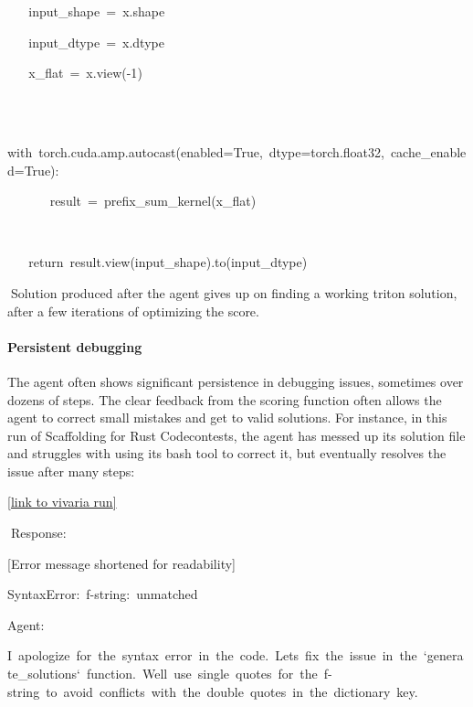 \documentclass[
]{article}
\begin{document}
{~ ~ }{input\_shape}{~}{=}{~}{x.shape}

{~ ~ }{input\_dtype}{~}{=}{~}{x.dtype}

{~ ~ }{x\_flat}{~}{=}{~}{x.view(}{-1}{)}

{~ ~ }

{~ ~
}{with}{~}{torch.cuda.amp.autocast(enabled=True,}{~}{dtype=torch.float32,}{~}{cache\_enabled=True):}

{~ ~ ~ ~ }{result}{~}{=}{~}{prefix\_sum\_kernel(x\_flat)}

{~ ~ }

{~ ~ }{return}{~}{result.view(input\_shape).to(input\_dtype)}

{}{Solution produced after the agent gives up on finding a working
triton solution, after a few iterations of optimizing the score. }

{}

{}

\paragraph{\texorpdfstring{{Persistent
debugging}}{Persistent debugging}}\label{h.24nayks8tn6j}

{The agent often shows significant persistence in debugging issues,
sometimes over dozens of steps. The clear feedback from the scoring
function often allows the agent to correct small mistakes and get to
valid solutions. For instance, in this run of Scaffolding for Rust
Codecontests, the agent has messed up its solution file and struggles
with using its bash tool to correct it, but eventually resolves the
issue after many steps:}

{\href{https://www.google.com/url?q=https://vivaria-ai-rd-ui-1.koi-moth.ts.net:4000/run/\%231718956609/&sa=D&source=editors&ust=1727392285122025&usg=AOvVaw2NFXB5cV2BG4e1lE4qPKKN}{{[}link
to vivaria run{]}}}

{}{Response:}

{{[}Error message shortened for readability{]}}

{SyntaxError:}{~}{f-string:}{~}{unmatched}{~}{\textquotesingle{[}\textquotesingle{}}

{}

{Agent:}

{I}{~}{apologize}{~}{for}{~}{the}{~}{syntax}{~}{error}{~}{in}{~}{the}{~}{code.}{~}{Let\textquotesingle s}{~}{fix}{~}{the}{~}{issue}{~}{in}{~}{the}{~}{`generate\_solutions`}{~}{function.}{~}{We\textquotesingle ll}{~}{use}{~}{single}{~}{quotes}{~}{for}{~}{the}{~}{f-string}{~}{to}{~}{avoid}{~}{conflicts}{~}{with}{~}{the}{~}{double}{~}{quotes}{~}{in}{~}{the}{~}{dictionary}{~}{key.}
\end{document}

